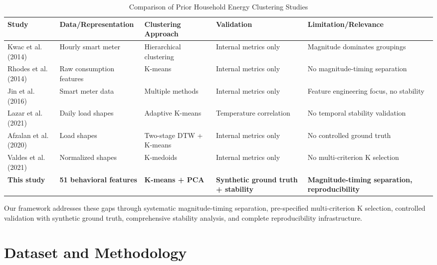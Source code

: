 \documentclass[11pt,a4paper]{article}
\begin{document}
\begin{table}[ht]
\centering
\small
\caption{Comparison of Prior Household Energy Clustering Studies}
\label{tab:literature_comparison}
\begin{tabular}{@{}p{3cm}p{2.5cm}p{2.5cm}p{2cm}p{3cm}@{}}
\toprule
Study & Data/Representation & Clustering Approach & Validation & Limitation/Relevance \\
\midrule
Kwac et al. (2014) \cite{kwac2014household} & Hourly smart meter & Hierarchical clustering & Internal metrics only & Magnitude dominates groupings \\
Rhodes et al. (2014) \cite{rhodes2014clustering} & Raw consumption features & K-means & Internal metrics only & No magnitude-timing separation \\
Jin et al. (2016) \cite{jin2016loadshape} & Smart meter data & Multiple methods & Internal metrics only & Feature engineering focus, no stability \\
Lazar et al. (2021) \cite{lazar2021investigating} & Daily load shapes & Adaptive K-means & Temperature correlation & No temporal stability validation \\
Afzalan et al. (2020) \cite{afzalan2020twostage} & Load shapes & Two-stage DTW + K-means & Internal metrics only & No controlled ground truth \\
Valdes et al. (2021) \cite{valdes2021smart} & Normalized shapes & K-medoids & Internal metrics only & No multi-criterion K selection \\
\midrule
\textbf{This study} & \textbf{51 behavioral features} & \textbf{K-means + PCA} & \textbf{Synthetic ground truth + stability} & \textbf{Magnitude-timing separation, reproducibility} \\
\bottomrule
\end{tabular}
\end{table}

Our framework addresses these gaps through systematic magnitude-timing separation, pre-specified multi-criterion K selection, controlled validation with synthetic ground truth, comprehensive stability analysis, and complete reproducibility infrastructure.

\section{Dataset and Methodology}
\label{sec:dataset}
\label{sec:methodology}
\end{document}
